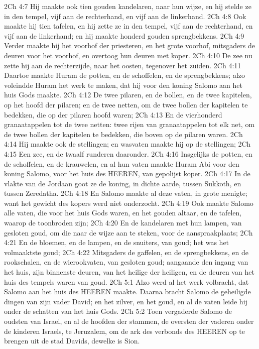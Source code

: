 2Ch 4:7  Hij maakte ook tien gouden kandelaren, naar hun wijze, en hij stelde ze in den tempel, vijf aan de rechterhand, en vijf aan de linkerhand.
2Ch 4:8  Ook maakte hij tien tafelen, en hij zette ze in den tempel, vijf aan de rechterhand, en vijf aan de linkerhand; en hij maakte honderd gouden sprengbekkens.
2Ch 4:9  Verder maakte hij het voorhof der priesteren, en het grote voorhof, mitsgaders de deuren voor het voorhof, en overtoog hun deuren met koper.
2Ch 4:10  De zee nu zette hij aan de rechterzijde, naar het oosten, tegenover het zuiden.
2Ch 4:11  Daartoe maakte Huram de potten, en de schoffelen, en de sprengbekkens; alzo voleindde Huram het werk te maken, dat hij voor den koning Salomo aan het huis Gods maakte.
2Ch 4:12  De twee pilaren, en de bollen, en de twee kapitelen, op het hoofd der pilaren; en de twee netten, om de twee bollen der kapitelen te bedekken, die op der pilaren hoofd waren;
2Ch 4:13  En de vierhonderd granaatappelen tot de twee netten: twee rijen van granaatappelen tot elk net, om de twee bollen der kapitelen te bedekken, die boven op de pilaren waren.
2Ch 4:14  Hij maakte ook de stellingen; en wasvaten maakte hij op de stellingen;
2Ch 4:15  Een zee, en de twaalf runderen daaronder.
2Ch 4:16  Insgelijks de potten, en de schoffelen, en de krauwelen, en al hun vaten maakte Huram Abi voor den koning Salomo, voor het huis des HEEREN, van gepolijst koper.
2Ch 4:17  In de vlakte van de Jordaan goot ze de koning, in dichte aarde, tussen Sukkoth, en tussen Zeredatha.
2Ch 4:18  En Salomo maakte al deze vaten, in grote menigte; want het gewicht des kopers werd niet onderzocht.
2Ch 4:19  Ook maakte Salomo alle vaten, die voor het huis Gods waren, en het gouden altaar, en de tafelen, waarop de toonbroden zijn;
2Ch 4:20  En de kandelaren met hun lampen, van gesloten goud, om die naar de wijze aan te steken, voor de aanspraakplaats;
2Ch 4:21  En de bloemen, en de lampen, en de snuiters, van goud; het was het volmaaktste goud;
2Ch 4:22  Mitsgaders de gaffelen, en de sprengbekkens, en de rookschalen, en de wierookvaten, van gesloten goud; aangaande den ingang van het huis, zijn binnenste deuren, van het heilige der heiligen, en de deuren van het huis des tempels waren van goud.
2Ch 5:1  Alzo werd al het werk volbracht, dat Salomo aan het huis des HEEREN maakte. Daarna bracht Salomo de geheiligde dingen van zijn vader David; en het zilver, en het goud, en al de vaten leide hij onder de schatten van het huis Gods.
2Ch 5:2  Toen vergaderde Salomo de oudsten van Israel, en al de hoofden der stammen, de oversten der vaderen onder de kinderen Israels, te Jeruzalem, om de ark des verbonds des HEEREN op te brengen uit de stad Davids, dewelke is Sion.
